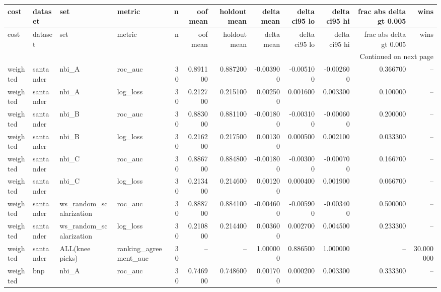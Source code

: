 \begin{landscape}
\begin{center}\label{tab:s10hold}\end{center}
\begingroup\tiny\setlength{\tabcolsep}{2.5pt}
\begin{longtable}{llllrrrrrrrr}
\toprule
cost & dataset & set & metric & n & oof mean & holdout mean & delta mean & delta ci95 lo & delta ci95 hi & frac abs delta gt 0.005 & wins \\
\midrule
\endfirsthead
\toprule
cost & dataset & set & metric & n & oof mean & holdout mean & delta mean & delta ci95 lo & delta ci95 hi & frac abs delta gt 0.005 & wins \\
\midrule
\endhead
\midrule
\multicolumn{12}{r}{Continued on next page} \\
\midrule
\endfoot
\bottomrule
\endlastfoot
weighted & santander & nbi\_A & roc\_auc & 30 & 0.891100 & 0.887200 & -0.003900 & -0.005100 & -0.002600 & 0.366700 & -- \\
weighted & santander & nbi\_A & log\_loss & 30 & 0.212700 & 0.215100 & 0.002500 & 0.001600 & 0.003300 & 0.100000 & -- \\
weighted & santander & nbi\_B & roc\_auc & 30 & 0.883000 & 0.881100 & -0.001800 & -0.003100 & -0.000600 & 0.200000 & -- \\
weighted & santander & nbi\_B & log\_loss & 30 & 0.216200 & 0.217500 & 0.001300 & 0.000500 & 0.002100 & 0.033300 & -- \\
weighted & santander & nbi\_C & roc\_auc & 30 & 0.886700 & 0.884800 & -0.001800 & -0.003000 & -0.000700 & 0.166700 & -- \\
weighted & santander & nbi\_C & log\_loss & 30 & 0.213400 & 0.214600 & 0.001200 & 0.000400 & 0.001900 & 0.066700 & -- \\
weighted & santander & ws\_random\_scalarization & roc\_auc & 30 & 0.888700 & 0.884100 & -0.004600 & -0.005900 & -0.003400 & 0.500000 & -- \\
weighted & santander & ws\_random\_scalarization & log\_loss & 30 & 0.210800 & 0.214400 & 0.003600 & 0.002700 & 0.004500 & 0.233300 & -- \\
weighted & santander & ALL(knee picks) & ranking\_agreement\_auc & 30 & -- & -- & 1.000000 & 0.886500 & 1.000000 & -- & 30.000000 \\
weighted & bnp & nbi\_A & roc\_auc & 30 & 0.746900 & 0.748600 & 0.001700 & 0.000200 & 0.003300 & 0.333300 & -- \\

\end{longtable}
\end{landscape}
